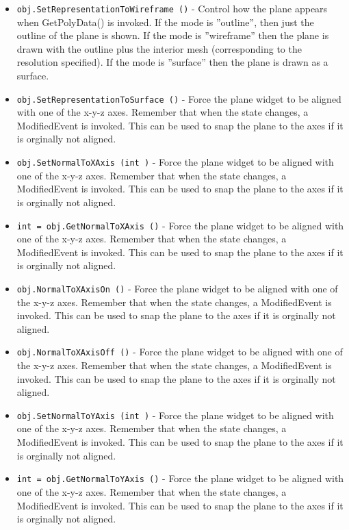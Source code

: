 \begin{itemize}
\item  \verb|obj.SetRepresentationToWireframe ()| -  Control how the plane appears when GetPolyData() is invoked.
 If the mode is ''outline'', then just the outline of the plane
 is shown. If the mode is ''wireframe'' then the plane is drawn
 with the outline plus the interior mesh (corresponding to the
 resolution specified). If the mode is ''surface'' then the plane
 is drawn as a surface.

\item  \verb|obj.SetRepresentationToSurface ()| -  Force the plane widget to be aligned with one of the x-y-z axes.
 Remember that when the state changes, a ModifiedEvent is invoked.
 This can be used to snap the plane to the axes if it is orginally
 not aligned.

\item  \verb|obj.SetNormalToXAxis (int )| -  Force the plane widget to be aligned with one of the x-y-z axes.
 Remember that when the state changes, a ModifiedEvent is invoked.
 This can be used to snap the plane to the axes if it is orginally
 not aligned.

\item  \verb|int = obj.GetNormalToXAxis ()| -  Force the plane widget to be aligned with one of the x-y-z axes.
 Remember that when the state changes, a ModifiedEvent is invoked.
 This can be used to snap the plane to the axes if it is orginally
 not aligned.

\item  \verb|obj.NormalToXAxisOn ()| -  Force the plane widget to be aligned with one of the x-y-z axes.
 Remember that when the state changes, a ModifiedEvent is invoked.
 This can be used to snap the plane to the axes if it is orginally
 not aligned.

\item  \verb|obj.NormalToXAxisOff ()| -  Force the plane widget to be aligned with one of the x-y-z axes.
 Remember that when the state changes, a ModifiedEvent is invoked.
 This can be used to snap the plane to the axes if it is orginally
 not aligned.

\item  \verb|obj.SetNormalToYAxis (int )| -  Force the plane widget to be aligned with one of the x-y-z axes.
 Remember that when the state changes, a ModifiedEvent is invoked.
 This can be used to snap the plane to the axes if it is orginally
 not aligned.

\item  \verb|int = obj.GetNormalToYAxis ()| -  Force the plane widget to be aligned with one of the x-y-z axes.
 Remember that when the state changes, a ModifiedEvent is invoked.
 This can be used to snap the plane to the axes if it is orginally
 not aligned.


\end{itemize}
